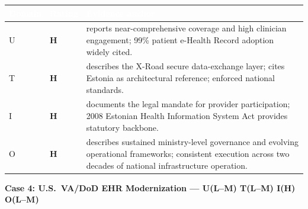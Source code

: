 \begin{table}[H]
\footnotesize
\begin{tabular}{p{1.2cm} >{\centering\arraybackslash}p{1.4cm} p{12.5cm}}
\toprule
\rowcolor{headerblue}
\textcolor{white}{\textbf{Domain}} &
\textcolor{white}{\textbf{Rating}} &
\textcolor{white}{\textbf{Evidence anchor}} \\
\midrule
\rowcolor{rowgray}
U & \cellcolor{highgreen}\textcolor{highgreentext}{\textbf{H}} &
\cite{estonia2026ehealth} reports near-comprehensive coverage and high clinician engagement; 99\% patient e-Health Record adoption widely cited. \\
T & \cellcolor{highgreen}\textcolor{highgreentext}{\textbf{H}} &
\cite{estonia2026ehealth} describes the X-Road secure data-exchange layer; \cite{holmgren2023policyhie} cites Estonia as architectural reference; enforced national standards. \\
\rowcolor{rowgray}
I & \cellcolor{highgreen}\textcolor{highgreentext}{\textbf{H}} &
\cite{europeancommission2016estoniaehr} documents the legal mandate for provider participation; 2008 Estonian Health Information System Act provides statutory backbone. \\
O & \cellcolor{highgreen}\textcolor{highgreentext}{\textbf{H}} &
\cite{estonia2026ehealth} describes sustained ministry-level governance and evolving operational frameworks; consistent execution across two decades of national infrastructure operation. \\
\bottomrule
\end{tabular}
\end{table}

\medskip

\noindent\textbf{Case 4: U.S.\ VA/DoD EHR Modernization --- U(L--M) T(L--M) I(H) O(L--M)}

